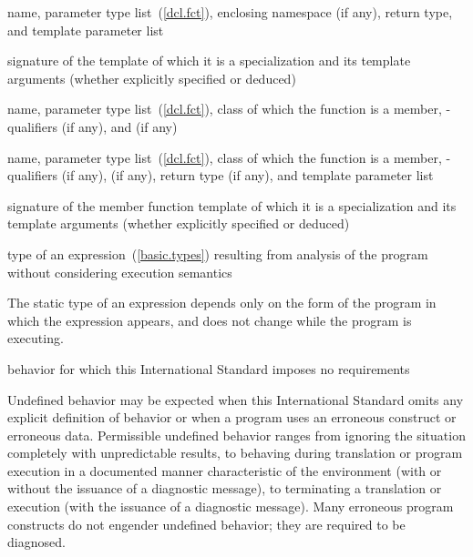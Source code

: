 %
 name, parameter type list~(\ref{dcl.fct}), enclosing namespace (if any),
return type, and template parameter list

%
 signature of the template of which it is a specialization
and its template arguments (whether explicitly specified or deduced)

%
 name, parameter type list~(\ref{dcl.fct}), class of which the
function is a member, \cv-qualifiers (if any),
and  (if any)

%
 name, parameter type list~(\ref{dcl.fct}), class of which the
function is a member, \cv-qualifiers (if any),
 (if any), return type (if any), and template parameter list

%
 signature of the member function template
of which it is a specialization and its template arguments (whether explicitly specified or deduced)

%
type of an expression~(\ref{basic.types}) resulting from
analysis of the program without considering execution semantics\\
\begin{note} The
static type of an expression depends only on the form of the program in
which the expression appears, and does not change while the program is
executing. \end{note}

%
behavior for which this International Standard
imposes no requirements\\
\begin{note} Undefined behavior may be expected when
this International Standard omits any explicit
definition of behavior or when a program uses an erroneous construct or erroneous data.
Permissible undefined behavior ranges
from ignoring the situation completely with unpredictable results, to
behaving during translation or program execution in a documented manner
characteristic of the environment (with or without the issuance of a
diagnostic message), to terminating a translation or execution (with the
issuance of a diagnostic message). Many erroneous program constructs do
not engender undefined behavior; they are required to be diagnosed.
\end{note}

